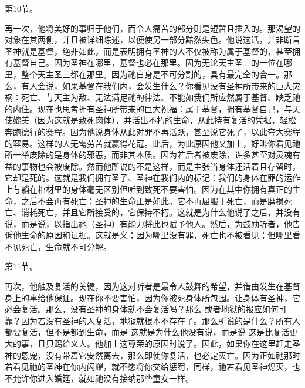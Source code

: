 第10节。\par

再一次，他将美好的事归于他们，而令人痛苦的部分则是短暂且插入的。那渴望的对象在其两侧，并且被详细陈述，以便使另一部分黯然失色。他说这话，并非断言圣神就是基督，绝非如此，而是表明拥有圣神的人不仅被称为属于基督的，甚至拥有基督自己。因为圣神在哪里，基督也必在那里。因为无论天主圣三的一位在哪里，整个天主圣三都在那里。因为祂自身是不可分割的，具有最完全的合一。那么，有人会说，如果基督在我们内，会发生什么？你看见没有圣神所带来的巨大灾祸：死亡、与天主为敌、无法满足祂的律法、不能如我们所应然属于基督、缺乏祂的内住。现在也思考拥有圣神所带来的巨大祝福：属于基督，拥有基督自己，与天使媲美（因为这就是致死肉体），并活出不朽的生命，从此持有复活的凭据，轻松奔跑德行的赛程。因为他说身体从此对罪不再活跃，甚至说它死了，以此夸大赛程的容易。这样的人无需劳苦就赢得花冠。此后，为此原因他又加上，好叫你看见祂所一举废除的是身体的邪恶，而非其本质。因为若后者被废除，许多甚至对灵魂有益的事物也会被废除。然而他所说的不是这样，而是主张当身体还活着且存留时，它却是死的。这就是我们拥有圣子、圣神在我们内的标记：我们的身体在罪的运作上与躺在棺材里的身体毫无区别但听到致死不要害怕。因为在其中你拥有真正的生命，之后不会再有死亡：圣神的生命正是如此。它不再屈服于死亡，而是磨损死亡、消耗死亡，并且它所接受的，它保持不朽。这就是为什么他说了之后，并没有说，而是说，以指出祂（圣神）有能力将此也赋予他人。然后，为鼓励听者，他告诉他生命的原因和证据。这就是义；因为哪里没有罪，死亡也不被看见；但哪里看不见死亡，生命就不可分解。\par

第11节。\par

再次，他触及复活的关键，因为这对听者是最令人鼓舞的希望，并借由发生在基督身上的事给他保证。现在你不要害怕，因为你被死身体所包围。让身体有圣神，它必会复活。那么，没有圣神的身体就不会复活吗？那么 或者地狱的报应如何可靠？因为若没有圣神的人复活，地狱就根本不存在了。那么所说的是什么？所有人都要复活，但不是都到生命，而是 这就是为什么他没有说，而是说 这是比复活更大的事，且只赐给义人。他加上这尊荣的原因时说了。因此，如果你在这里赶走圣神的恩宠，没有带着它安然离去，那么即使你复活，也必定灭亡。因为正如祂那时若看见祂的圣神在你内闪耀，就不愿将你交给惩罚，同样，祂若看见圣神熄灭，也不允许你进入婚筵，就如祂没有接纳那些童女一样。\par

